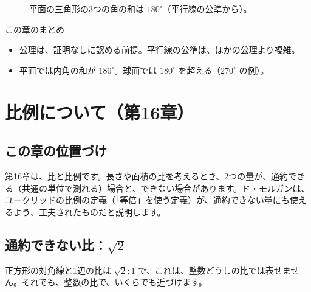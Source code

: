 \documentclass[a4paper,11pt,openany]{ltjsbook}
\begin{document}
\begin{figure}[htbp]
\centering
{}
\caption{平面の三角形の3つの角の和は $180^\circ$（平行線の公準から）。}
\end{figure}

\begin{pointbox}{この章のまとめ}
\begin{itemize}[leftmargin=*]
\item 公理は、証明なしに認める前提。平行線の公準は、ほかの公理より複雑。
\item 平面では内角の和が $180^\circ$。球面では $180^\circ$ を超える（$270^\circ$ の例）。
\end{itemize}
\end{pointbox}

\chapter{比例について（第16章）}

\section{この章の位置づけ}

第16章は、比と比例です。長さや面積の比を考えるとき、2つの量が、通約できる（共通の単位で測れる）場合と、できない場合があります。ド・モルガンは、ユークリッドの比例の定義（「等倍」を使う定義）が、通約できない量にも使えるよう、工夫されたものだと説明します。

\section{通約できない比：$\sqrt2$}

正方形の対角線と1辺の比は $\sqrt2:1$ で、これは、整数どうしの比では表せません。それでも、整数の比で、いくらでも近づけます。
\end{document}

